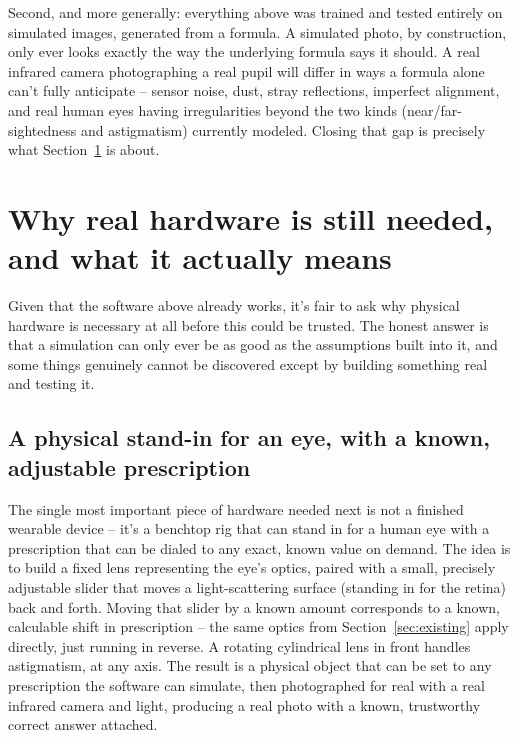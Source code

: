\documentclass[11pt]{article}
\begin{document}
Second, and more generally: everything above was trained and tested entirely on simulated images, generated from a formula. A simulated photo, by construction, only ever looks exactly the way the underlying formula says it should. A real infrared camera photographing a real pupil will differ in ways a formula alone can't fully anticipate -- sensor noise, dust, stray reflections, imperfect alignment, and real human eyes having irregularities beyond the two kinds (near/far-sightedness and astigmatism) currently modeled. Closing that gap is precisely what Section~\ref{sec:hardware} is about.

\section{Why real hardware is still needed, and what it actually means}
\label{sec:hardware}

Given that the software above already works, it's fair to ask why physical hardware is necessary at all before this could be trusted. The honest answer is that a simulation can only ever be as good as the assumptions built into it, and some things genuinely cannot be discovered except by building something real and testing it.

\subsection{A physical stand-in for an eye, with a known, adjustable prescription}
The single most important piece of hardware needed next is not a finished wearable device -- it's a benchtop rig that can stand in for a human eye with a prescription that can be dialed to any exact, known value on demand. The idea is to build a fixed lens representing the eye's optics, paired with a small, precisely adjustable slider that moves a light-scattering surface (standing in for the retina) back and forth. Moving that slider by a known amount corresponds to a known, calculable shift in prescription -- the same optics from Section~\ref{sec:existing} apply directly, just running in reverse. A rotating cylindrical lens in front handles astigmatism, at any axis. The result is a physical object that can be set to any prescription the software can simulate, then photographed for real with a real infrared camera and light, producing a real photo with a known, trustworthy correct answer attached.
\end{document}
